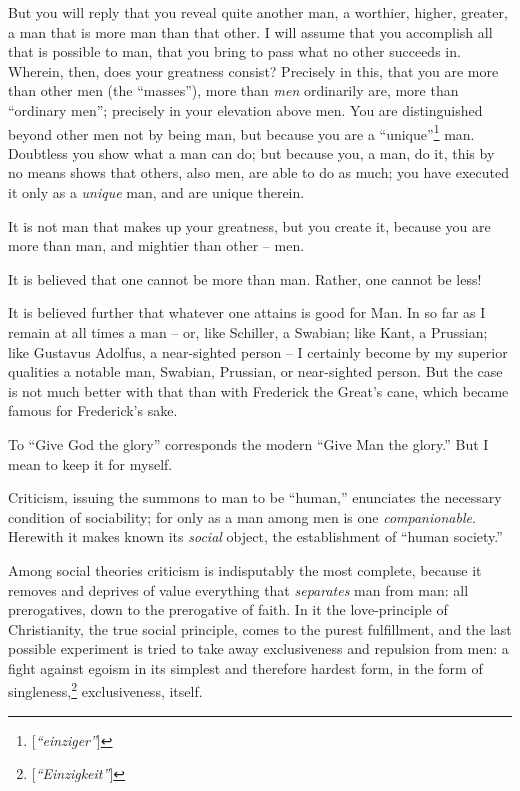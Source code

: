 \documentclass[12pt,a4paper]{book}
\begin{document}
But you will reply that you reveal quite another man, a worthier, higher, 
greater, a man that is more man than that other. I will assume that you 
accomplish all that is possible to man, that you bring to pass what no other 
succeeds in. Wherein, then, does your greatness consist? Precisely in this, 
that you are more than other men (the ``masses''), more than \textit{men} 
ordinarily are, more than ``ordinary men''; precisely in your elevation 
above men. You are distinguished beyond other men not by being man, but 
because you are a ``unique''\footnote{[\textit{``einziger''}]} man. 
Doubtless you show what a man can do; but because you, a man, do it, this by 
no means shows that others, also men, are able to do as much; you have 
executed it only as a \textit{unique} man, and are unique therein.

It is not man that makes up your greatness, but you create it, because you are 
more than man, and mightier than other -- men.

It is believed that one cannot be more than man. Rather, one cannot be less!

It is believed further that whatever one attains is good for Man. In so far as 
I remain at all times a man -- or, like Schiller, a Swabian; like Kant, a 
Prussian; like Gustavus Adolfus, a near-sighted person -- I certainly become 
by my superior qualities a notable man, Swabian, Prussian, or near-sighted 
person. But the case is not much better with that than with Frederick the 
Great's cane, which became famous for Frederick's sake.

To ``Give God the glory'' corresponds the modern ``Give Man the glory.'' 
But I mean to keep it for myself.

Criticism, issuing the summons to man to be ``human,'' enunciates the 
necessary condition of sociability; for only as a man among men is one 
\textit{companionable}. Herewith it makes known its \textit{social} object, 
the establishment of ``human society.''

Among social theories criticism is indisputably the most complete, because it 
removes and deprives of value everything that \textit{separates} man from man: 
all prerogatives, down to the prerogative of faith. In it the love-principle 
of Christianity, the true social principle, comes to the purest fulfillment, 
and the last possible experiment is tried to take away exclusiveness and 
repulsion from men: a fight against egoism in its simplest and therefore 
hardest form, in the form of singleness,\footnote{[\textit{``Einzigkeit''}]} 
exclusiveness, itself.
\end{document}
